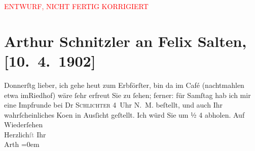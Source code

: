 
\begin{center}
            \textcolor{red}{ENTWURF, NICHT FERTIG KORRIGIERT}
                      \end{center}
            
         
         \renewcommand{\erwaehntePersonen}{Personen: Felix Salten, Felix Schlichter}
         \renewcommand{\erwaehnteOrte}{Orte: Riedhof, Wien}
         \renewcommand{\erwaehnteWerke}{Werke: Der Erbförster}
               \section[Arthur Schnitzler an Felix Salten, {[}10. 4. 1902{]}]{ Arthur Schnitzler an Felix Salten, {[}10. 4. 1902{]}}\nopagebreak{}\rehead{ }\begin{ledgroupsized}[t]{13cm}\normalsize\beginnumbering \toendnotes[C]{\smallbreak\pagebreak[2]} 
\pstart
           \raggedleft{}{\pb}Donnerſtg\pend
           \pstart
           lieber, ich gehe heut zum Erbförſter,
               bin da{\geminationn} im Café (nachtmahlen etwa imRiedhof) wäre ſehr erfreut Sie zu ſehen; ferner: für Samſtag hab ich
               mir eine Impfrunde {\pb}bei Dr \textsc{Schlichter}{ }4 Uhr N. M. beſtellt, und auch Ihr wahrſcheinliches Ko{\geminationm}en in Ausſicht geſtellt. Ich würd Sie um ½ 4 abholen. \pend
           \pstart
           Auf Wiederſehen {\\[\baselineskip]}Herzlich\textcolor{gray}{ſt} Ihr {\\[\baselineskip]}\spacefill\mbox{Arth}\pend
           \leftskip=0em{}
         
         \endnumbering{}\end{ledgroupsized}\begin{anhang}\end{anhang}\newcommand{\dateiname}{L02973}\newcommand{\titel}{Arthur Schnitzler an Felix Salten, [10. 4. 1902]}\newcommand{\editorInnen}{Martin Anton Müller und Laura Untner}
      